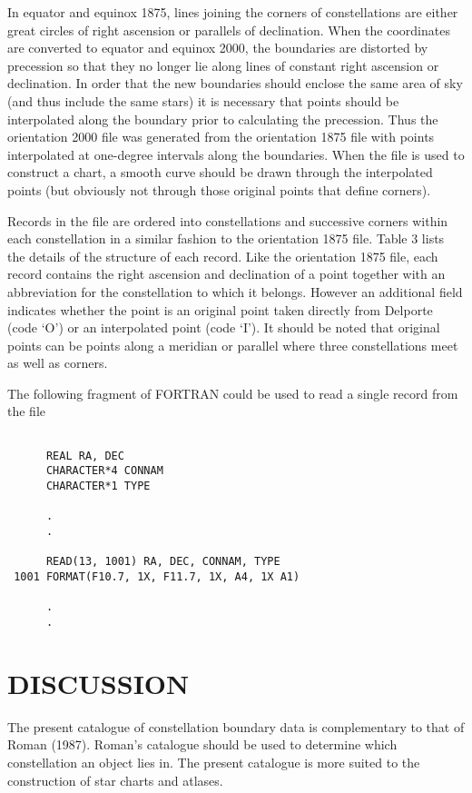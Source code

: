 In equator and equinox 1875, lines joining the corners of constellations are
either great circles of right ascension or parallels of declination. When the
coordinates are converted to equator and equinox 2000, the boundaries are
distorted by precession so that they no longer lie along lines of constant right
ascension or declination. In order that the new boundaries should enclose the
same area of sky (and thus include the same stars) it is necessary that points
should be interpolated along the boundary prior to calculating the precession.
Thus the orientation 2000 file was generated from the orientation 1875 file with
points interpolated at one-degree intervals along the boundaries. When the file
is used to construct a chart, a smooth curve should be drawn through the
interpolated points (but obviously not through those original points that define
corners).

Records in the file are ordered into constellations and successive corners
within each constellation in a similar fashion to the orientation 1875 file.
Table 3 lists the details of the structure of each record. Like the orientation
1875 file, each record contains the right ascension and declination of a point
together with an abbreviation for the constellation to which it belongs. However
an additional field indicates whether the point is an original point taken
directly from Delporte (code `O') or an interpolated point (code `I'). It should
be noted that original points can be points along a meridian or parallel where
three constellations meet as well as corners.

The following fragment of FORTRAN could be used to read a single record from the
file

\begin{verbatim}

      REAL RA, DEC
      CHARACTER*4 CONNAM
      CHARACTER*1 TYPE

      .
      .

      READ(13, 1001) RA, DEC, CONNAM, TYPE
 1001 FORMAT(F10.7, 1X, F11.7, 1X, A4, 1X A1)

      .
      .

\end{verbatim}

\section{DISCUSSION}

The present catalogue of constellation boundary data is complementary to that of
Roman (1987). Roman's catalogue should be used to determine which constellation
an object lies in. The present catalogue is more suited to the construction of
star charts and atlases.

